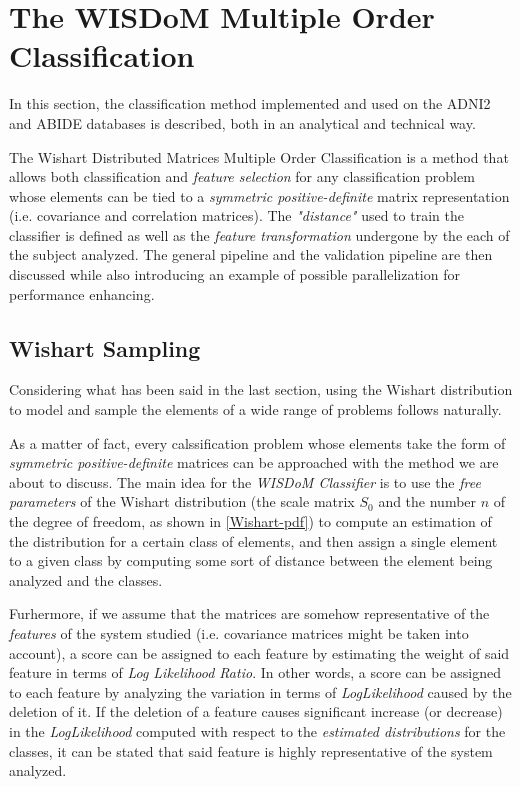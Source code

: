 \documentclass[12pt,openright,twoside,a4paper]{book}
\begin{document}
\chapter{The WISDoM Multiple Order Classification}

In this section, the classification method implemented and used on the ADNI2 and ABIDE databases is described, both in an analytical and technical way.

The Wishart Distributed Matrices Multiple Order Classification is a method that allows both classification and \textit{feature selection} for any classification problem whose elements can be tied to a \textit{symmetric positive-definite} matrix representation (i.e. covariance and correlation matrices).
The \textit{"distance"} used to train the classifier is defined as well as the \textit{feature transformation} undergone by the each of the subject analyzed.
The general pipeline and the validation pipeline are then discussed while also introducing an example of possible parallelization for performance enhancing.

\section{Wishart Sampling}

Considering what has been said in the last section, using the Wishart distribution to model and sample the elements of a wide range of problems follows naturally.

As a matter of fact, every calssification problem whose elements take the form of \textit{symmetric positive-definite} matrices can be approached with the method we are about to discuss.
The main idea for the \textit{WISDoM Classifier} is to use the \textit{free parameters} of the Wishart distribution (the scale matrix $S_0$ and the number $n$ of the degree of freedom, as shown in \ref{Wishart-pdf}) to compute an estimation of the distribution for a certain class of elements, and then assign a single element to a given class by computing some sort of distance between the element being analyzed and the classes.

Furhermore, if we assume that the matrices are somehow representative of the \textit{features} of the system studied (i.e. covariance  matrices might be taken into account), a score can be assigned to each feature by estimating the weight of said feature in terms of \textit{Log Likelihood Ratio}.
In other words, a score can be assigned to each feature by analyzing the variation in terms of \textit{LogLikelihood} caused by the deletion of it. 
If the deletion of a feature causes significant increase (or decrease) in the \textit{LogLikelihood} computed with respect to the \textit{estimated distributions} for the classes, it can be stated that said feature is highly representative of the system analyzed.
\end{document}
